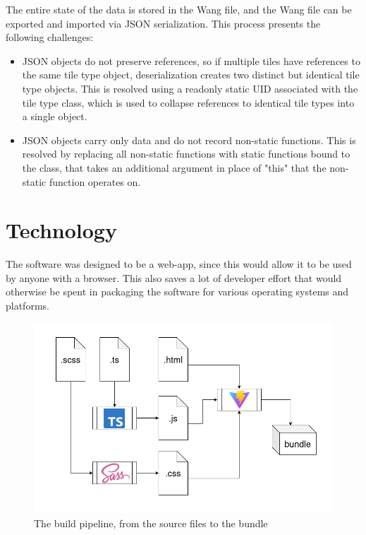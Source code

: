 \documentclass[letterpaper,11pt]{article}
\begin{document}
The entire state of the data is stored in the Wang file, and the Wang file can be exported and imported via JSON \cite{json} serialization. This process presents the following challenges:


\begin{itemize}
	\item JSON objects do not preserve references, so if multiple tiles have references to the same tile type object, deserialization creates two distinct but identical tile type objects. This is resolved using a readonly static UID associated with the tile type class, which is used to collapse references to identical tile types into a single object. 
	\item JSON objects carry only data and do not record non-static functions. This is resolved by replacing all non-static functions with static functions bound to the class, that takes an additional argument in place of "this" that the non-static function operates on.
	
\end{itemize}

\section*{Technology}

The software was designed to be a web-app, since this would allow it to be used by anyone with a browser. This also saves a lot of developer effort that would otherwise be spent in packaging the software for various operating systems and platforms.

\begin{figure}[h!tbp]
	\centering
	\includegraphics[width=6.4in]{figures/pipeline.png}
	\caption{The build pipeline, from the source files to the bundle}
	\label{fig:2}
\end{figure}
\end{document}
